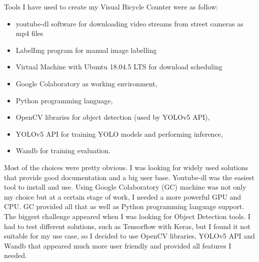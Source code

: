 Tools I have used to create my Visual Bicycle Counter were as follow:
\begin{itemize}
    \item youtube-dl software for downloading video streams from street cameras as mp4 files
    \item LabelImg program for manual image labelling 
    \item Virtual Machine with Ubuntu 18.04.5 LTS for download scheduling 
    \item Google Colaboratory as working environment,
    \item Python programming language,
    \item OpenCV libraries for object detection (used by YOLOv5 API),
    \item YOLOv5 API for training YOLO \cite{Redmon_2016_CVPR} models and performing inference,
    \item Wandb for training evaluation.
\end{itemize}
Most of the choices were pretty obvious. I was looking for widely used solutions that provide good documentation and a big user base. Youtube-dl was the easiest tool to install and use. Using Google Colaboratory (GC) machine was not only my choice but at a certain stage of work, I needed a more powerful GPU and CPU. GC provided all that as well as Python programming language support. The biggest challenge appeared when I was looking for Object Detection tools. I had to test different solutions, such as Tensorflow with Keras, but I found it not suitable for my use case, so I decided to use OpenCV libraries, YOLOv5 API and Wandb that appeared much more user friendly and provided all features I needed.
